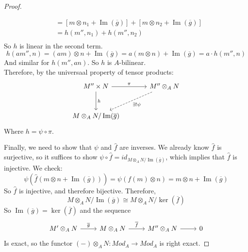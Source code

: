 \documentclass[hidelinks,12pt]{article}
\newcommand{\im}{\operatorname{Im}}
\begin{document}
\begin{proof}
\begin{enumerate}[label=(\roman*).]
\begin{align*}
                          &=\left[m\otimes n_{1}+\im(\overline{g})\right]+\left[m\otimes n_{2}+\im(\overline{g})\right]\\
    &=h(m'',n_{1})+h(m'',n_{2})\\
    \end{align*}
    So \(h\) is linear in the second term.
    \[
        h(am'',n)=(am)\otimes n+\im(\overline{g})=a(m\otimes n)+\im(\overline{g})=a\cdot h(m'',n)
    \]
    And similar for \(h(m'',an)\). So \(h\) is \(A\)-bilinear.\\
    Therefore, by the universaal property of tensor products:
    \[
    \begin{tikzcd}[row sep=large,column sep=large]
        M''\times N \arrow[r, "\pi"] \arrow[d, "h"] & M''\otimes_{A}N \arrow[dl, "\exists !\psi",dashed] \\
        M\otimes_{A}N/\im(\overline{g})  &
    \end{tikzcd}
    \]
    Where \(h=\psi\circ\pi\).
\end{enumerate}
Finally, we need to show that \(\psi\) and \(\hat{f}\) are inverses. We already know \(\hat{f}\) is surjective, so it suffices to show \(\psi\circ \hat{f}=id_{M\otimes_{A}N/\im(\overline{g})}\), which implies that \(\hat{f}\) is injective. We check:
\[
    \psi(\hat{f}(m\otimes n+\im(\overline{g})))=\psi(f(m)\otimes n)=m\otimes n +\im(\overline{g})
\]
So \(\hat{f}\) is injective, and therefore bijective. Therefore, \[
    M\otimes_{A}N/\im(\overline{g})\cong M\otimes_{A} N/\ker(\overline{f})
\]
So \(\im(\overline{g})=\ker(\overline{f})\) and the sequence
\[
    \begin{tikzcd} M'\otimes_{A} N \arrow[r, "\overline{g}"] & M\otimes_{A} N \arrow[r, "\overline{f}"] & M''\otimes_{A} N \arrow[r] & 0 \end{tikzcd}
\]
Is exact, so the functor \((-)\otimes_{A}N:Mod_{A}\to Mod_{A}\) is right exact.
\end{proof}
\end{document}
